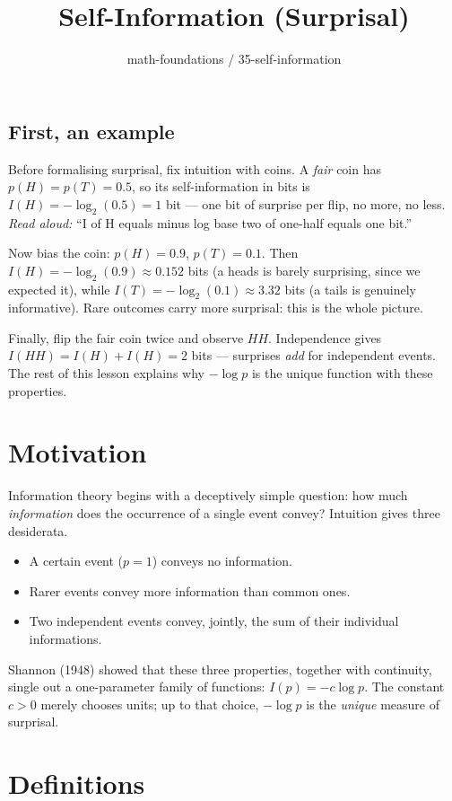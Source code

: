 \documentclass[11pt]{article}
\title{Self-Information (Surprisal)}
\author{math-foundations / 35-self-information}
\date{}
\theoremstyle{definition}
\theoremstyle{remark}
\begin{document}
\maketitle

\subsection*{First, an example}

Before formalising surprisal, fix intuition with coins. A \emph{fair} coin has
$p(H) = p(T) = 0.5$, so its self-information in bits is
$I(H) = -\log_2(0.5) = 1$ bit --- one bit of surprise per flip, no more, no less.
\emph{Read aloud:} ``I of H equals minus log base two of one-half equals one bit.''

Now bias the coin: $p(H) = 0.9$, $p(T) = 0.1$. Then
$I(H) = -\log_2(0.9) \approx 0.152$ bits (a heads is barely surprising, since we
expected it), while $I(T) = -\log_2(0.1) \approx 3.32$ bits (a tails is genuinely
informative). Rare outcomes carry more surprisal: this is the whole picture.

Finally, flip the fair coin twice and observe $HH$. Independence gives
$I(HH) = I(H) + I(H) = 2$ bits --- surprises \emph{add} for independent events.
The rest of this lesson explains why $-\log p$ is the unique function with these
properties.

\section{Motivation}

Information theory begins with a deceptively simple question: how much
\emph{information} does the occurrence of a single event convey? Intuition
gives three desiderata.
\begin{itemize}
  \item A certain event ($p = 1$) conveys no information.
  \item Rarer events convey more information than common ones.
  \item Two independent events convey, jointly, the sum of their individual
        informations.
\end{itemize}
Shannon (1948) showed that these three properties, together with continuity,
single out a one-parameter family of functions: $I(p) = -c \log p$. The
constant $c > 0$ merely chooses units; up to that choice, $-\log p$ is the
\emph{unique} measure of surprisal.

\section{Definitions}
\end{document}
